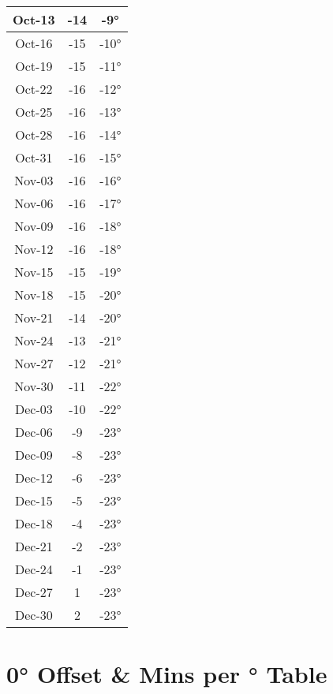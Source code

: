 \begin{footnotesize}
\begin{minipage}{0.33\textwidth}
\begin{tabular}[t]{c | c | c}
Oct-13 & -14 & -9°\\\hline
Oct-16 & -15 & -10°\\\hline
Oct-19 & -15 & -11°\\\hline
Oct-22 & -16 & -12°\\\hline
Oct-25 & -16 & -13°\\\hline
Oct-28 & -16 & -14°\\\hline
Oct-31 & -16 & -15°\\\hline
Nov-03 & -16 & -16°\\\hline
Nov-06 & -16 & -17°\\\hline
Nov-09 & -16 & -18°\\\hline
Nov-12 & -16 & -18°\\\hline
Nov-15 & -15 & -19°\\\hline
Nov-18 & -15 & -20°\\\hline
Nov-21 & -14 & -20°\\\hline
Nov-24 & -13 & -21°\\\hline
Nov-27 & -12 & -21°\\\hline
Nov-30 & -11 & -22°\\\hline
Dec-03 & -10 & -22°\\\hline
Dec-06 & -9 & -23°\\\hline
Dec-09 & -8 & -23°\\\hline
Dec-12 & -6 & -23°\\\hline
Dec-15 & -5 & -23°\\\hline
Dec-18 & -4 & -23°\\\hline
Dec-21 & -2 & -23°\\\hline
Dec-24 & -1 & -23°\\\hline
Dec-27 & 1 & -23°\\\hline
Dec-30 & 2 & -23°\\\hline
\end{tabular}\end{minipage}
\end{footnotesize}

\section{0° Offset \& Mins per ° Table}

